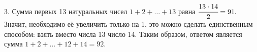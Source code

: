 3. Сумма первых 13 натуральных чисел $1+2+\ldots+13$ равна $\cfrac{13\cdot14}{2}=91.$ Значит, необходимо её увеличить только на 1, это можно сделать единственным способом: взять вместо числа 13 число 14. Таким образом, ответом является сумма $1+2+\ldots+12+14=92.$\\
